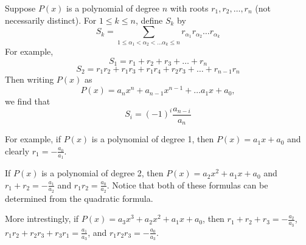 \documentclass[12pt]{article}
\begin{document}
Suppose $P(x)$ is a polynomial of degree $n$ with roots $r_1, r_2, \ldots, r_n$ (not necessarily distinct). For $1\leq k\leq n$, define $S_k$ by
\[S_k = \sum\limits_{1\leq\alpha_{1} < \alpha_{2} < \ldots\alpha_k\leq n} r_{\alpha_1}r_{\alpha_2}\ldots r_{\alpha_k}\]
For example, 
\[S_1 = r_1 + r_2 + r_3 + \ldots + r_n\]
\[S_2 = r_1r_2 + r_1r_3 + r_1r_4 + r_2r_3 + \ldots + r_{n-1}r_{n}\]
Then writing $P(x)$ as 
\[P(x) = a_nx^n + a_{n-1}x^{n-1} + \ldots a_{1}x + a_{0},\]
we find that 
\[S_i = (-1)^{i}\frac{a_{n-i}}{a_n}\]

For example, if $P(x)$ is a polynomial of degree 1, then $P(x) = a_1x + a_0$ and clearly $r_1 = -\frac{a_0}{a_1}$.

If $P(x)$ is a polynomial of degree 2, then $P(x) = a_2x^2 + a_1x + a_0$ and  $r_1 + r_2 = -\frac{a_1}{a_2}$ and $r_1r_2 = \frac{a_0}{a_2}$. Notice that both of these formulas can be determined from the quadratic formula. 

More intrestingly, if $P(x) = a_3x^3 + a_2x^2 + a_1x + a_0$, then $r_1 + r_2 + r_3 = -\frac{a_2}{a_3}$, $r_1r_2 + r_2r_3 + r_3r_1 = \frac{a_1}{a_3}$, and $r_1r_2r_3 = -\frac{a_0}{a_3}$.
\end{document}
